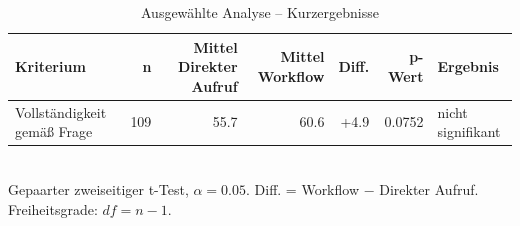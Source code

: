 \begin{table}[htbp]
\centering
\caption{Ausgewählte Analyse -- Kurzergebnisse}
\begin{tabular}{lrrrrrl}
\toprule
Kriterium & n & Mittel Direkter Aufruf & Mittel Workflow & Diff. & p-Wert & Ergebnis \\
\midrule
Vollständigkeit gemäß Frage & 109 & 55.7 & 60.6 & +4.9 & 0.0752 & nicht signifikant \\
\bottomrule
\end{tabular}
\\[2mm]
\footnotesize Gepaarter zweiseitiger t-Test, $\alpha=0.05$. Diff. = Workflow $-$ Direkter Aufruf. Freiheitsgrade: $df=n-1$.
\end{table}
